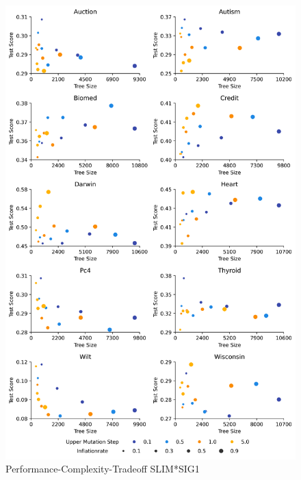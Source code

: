
    \begin{figure}[H]
    \centering
    \includegraphics[width=\linewidth]{../Latex/Chapters/Figures/Results/inflationrate_performance_complexity_tradeoff_mulsig1.png}
    \caption{Performance-Complexity-Tradeoff SLIM*SIG1}
    \label{fig:inflationrate_performance_complexity_tradeoff_mulsig1}
    \end{figure}
    